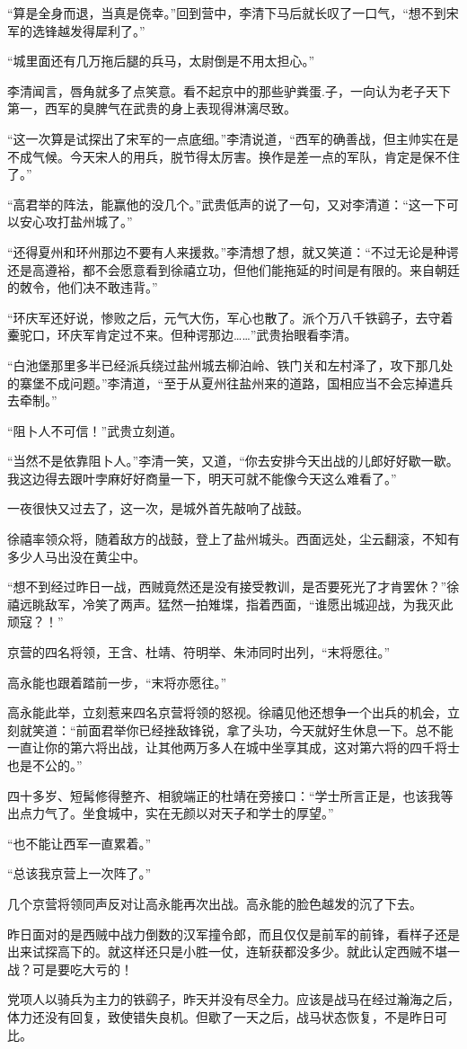 “算是全身而退，当真是侥幸。”回到营中，李清下马后就长叹了一口气，“想不到宋军的选锋越发得犀利了。”

“城里面还有几万拖后腿的兵马，太尉倒是不用太担心。”

李清闻言，唇角就多了点笑意。看不起京中的那些驴粪蛋.子，一向认为老子天下第一，西军的臭脾气在武贵的身上表现得淋漓尽致。

“这一次算是试探出了宋军的一点底细。”李清说道，“西军的确善战，但主帅实在是不成气候。今天宋人的用兵，脱节得太厉害。换作是差一点的军队，肯定是保不住了。”

“高君举的阵法，能赢他的没几个。”武贵低声的说了一句，又对李清道：“这一下可以安心攻打盐州城了。”

“还得夏州和环州那边不要有人来援救。”李清想了想，就又笑道：“不过无论是种谔还是高遵裕，都不会愿意看到徐禧立功，但他们能拖延的时间是有限的。来自朝廷的敇令，他们决不敢违背。”

“环庆军还好说，惨败之后，元气大伤，军心也散了。派个万八千铁鹞子，去守着櫜驼口，环庆军肯定过不来。但种谔那边……”武贵抬眼看李清。

“白池堡那里多半已经派兵绕过盐州城去柳泊岭、铁门关和左村泽了，攻下那几处的寨堡不成问题。”李清道，“至于从夏州往盐州来的道路，国相应当不会忘掉遣兵去牵制。”

“阻卜人不可信！”武贵立刻道。

“当然不是依靠阻卜人。”李清一笑，又道，“你去安排今天出战的儿郎好好歇一歇。我这边得去跟叶孛麻好好商量一下，明天可就不能像今天这么难看了。”

一夜很快又过去了，这一次，是城外首先敲响了战鼓。

徐禧率领众将，随着敌方的战鼓，登上了盐州城头。西面远处，尘云翻滚，不知有多少人马出没在黄尘中。

“想不到经过昨日一战，西贼竟然还是没有接受教训，是否要死光了才肯罢休？”徐禧远眺敌军，冷笑了两声。猛然一拍雉堞，指着西面，“谁愿出城迎战，为我灭此顽寇？！”

京营的四名将领，王含、杜靖、符明举、朱沛同时出列，“末将愿往。”

高永能也跟着踏前一步，“末将亦愿往。”

高永能此举，立刻惹来四名京营将领的怒视。徐禧见他还想争一个出兵的机会，立刻就笑道：“前面君举你已经挫敌锋锐，拿了头功，今天就好生休息一下。总不能一直让你的第六将出战，让其他两万多人在城中坐享其成，这对第六将的四千将士也是不公的。”

四十多岁、短髯修得整齐、相貌端正的杜靖在旁接口：“学士所言正是，也该我等出点力气了。坐食城中，实在无颜以对天子和学士的厚望。”

“也不能让西军一直累着。”

“总该我京营上一次阵了。”

几个京营将领同声反对让高永能再次出战。高永能的脸色越发的沉了下去。

昨日面对的是西贼中战力倒数的汉军撞令郎，而且仅仅是前军的前锋，看样子还是出来试探高下的。就这样还只是小胜一仗，连斩获都没多少。就此认定西贼不堪一战？可是要吃大亏的！

党项人以骑兵为主力的铁鹞子，昨天并没有尽全力。应该是战马在经过瀚海之后，体力还没有回复，致使错失良机。但歇了一天之后，战马状态恢复，不是昨日可比。

